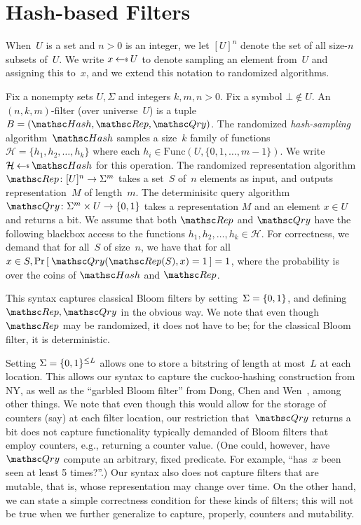 \section{Hash-based Filters}
When~$U$ is a set and $n>0$ is an integer, we let $[U]^n$ denote the set of all size-$n$ subsets of~$U$.
We write $x \getsr U$ to denote sampling an element from~$U$ and assigning this to~$x$, and we extend this notation to randomized algorithms.

Fix a nonempty sets $U,\Sigma$ and integers $k,m,n>0$.  Fix a symbol $\bot \not\in U$.  An $(n,k,m)$-filter (over universe~$U$) is a tuple  $B=(\Hash,\Rep,\Qry)$.
%
The randomized \emph{hash-sampling} algorithm~$\Hash$ samples a size~$k$ family of functions~$\mathcal{H}=\{h_1,h_2,\ldots,h_k\}$ where each $h_i \in  \mathrm{Func}(U,\{0,1,\ldots,m-1\})$.  We write $\mathcal{H} \getsr \Hash$ for this operation.
%
The randomized representation algorithm $\Rep\colon [U]^n \rightarrow \Sigma^m$ takes a set~$S$ of~$n$ elements as input, and outputs representation~$M$ of length~$m$.
%
The determinisitc query algorithm $\Qry\colon \Sigma^m \times U \rightarrow \bits$ takes a representation $M$ and an element $x \in U$ and returns a bit.
%
We assume that both $\Rep$ and $\Qry$ have the following blackbox access to the functions $h_1,h_2,\ldots,h_k \in \mathcal{H}$.
%
For correctness, we demand that for all~$S$ of size~$n$, we have that for all $x \in S, \Prob{\Qry(\Rep(S),x)=1}=1$, where the probability is over the coins of $\Hash$ and $\Rep$.


This syntax captures classical Bloom filters by setting~$\Sigma=\{0,1\}$,  and defining $\Rep,\Qry$ in the obvious way. We note that even though $\Rep$ may be randomized, it does not have to be; for the classical Bloom filter, it is deterministic.

Setting $\Sigma=\{0,1\}^{\leq L}$ allows one to store a bitstring of length at most~$L$ at each location.  This allows our syntax to capture the cuckoo-hashing construction from NY, as well as the ``garbled Bloom filter'' from Dong, Chen and Wen~\cite{xxx}, among other things. We note that even though this would allow for the storage of counters (say) at each filter location, our restriction that~$\Qry$ returns a bit does not capture functionality typically demanded of Bloom filters that employ counters, e.g., returning a counter value. (One could, however, have $\Qry$ compute an arbitrary, fixed predicate.  For example, ``has~$x$ been seen at least 5 times?''.)
Our syntax also does not capture filters that are mutable, that is, whose representation may change over time.
On the other hand, we can state a simple correctness condition for these kinds of filters; this will not be true when we further generalize to capture, properly, counters and mutability.

